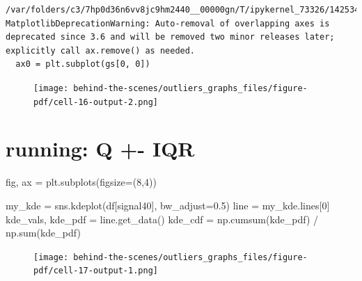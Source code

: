 \documentclass[
  letterpaper,
  DIV=11,
  numbers=noendperiod,
  oneside]{scrreprt}
\newenvironment{Shaded}{\begin{snugshade}}{\end{snugshade}}
\newcommand{\BuiltInTok}[1]{\textcolor[rgb]{0.00,0.23,0.31}{#1}}
\newcommand{\DecValTok}[1]{\textcolor[rgb]{0.68,0.00,0.00}{#1}}
\newcommand{\FloatTok}[1]{\textcolor[rgb]{0.68,0.00,0.00}{#1}}
\newcommand{\NormalTok}[1]{\textcolor[rgb]{0.00,0.23,0.31}{#1}}
\newcommand{\OperatorTok}[1]{\textcolor[rgb]{0.37,0.37,0.37}{#1}}
\newcommand{\StringTok}[1]{\textcolor[rgb]{0.13,0.47,0.30}{#1}}
\begin{document}
\begin{verbatim}
/var/folders/c3/7hp0d36n6vv8jc9hm2440__00000gn/T/ipykernel_73326/142534422.py:6: MatplotlibDeprecationWarning: Auto-removal of overlapping axes is deprecated since 3.6 and will be removed two minor releases later; explicitly call ax.remove() as needed.
  ax0 = plt.subplot(gs[0, 0])
\end{verbatim}

\begin{figure}[H]

{\centering \texttt{[image: behind-the-scenes/outliers\_graphs\_files/figure-pdf/cell-16-output-2.png]}

}

\end{figure}

\hypertarget{running-q---iqr}{%
\section{running: Q +- IQR}\label{running-q---iqr}}

\begin{Shaded}
\begin{Highlighting}[]
\NormalTok{fig, ax }\OperatorTok{=}\NormalTok{ plt.subplots(figsize}\OperatorTok{=}\NormalTok{(}\DecValTok{8}\NormalTok{,}\DecValTok{4}\NormalTok{))}

\NormalTok{my\_kde }\OperatorTok{=}\NormalTok{ sns.kdeplot(df[}\StringTok{\textquotesingle{}signal40\textquotesingle{}}\NormalTok{], bw\_adjust}\OperatorTok{=}\FloatTok{0.5}\NormalTok{)}
\NormalTok{line }\OperatorTok{=}\NormalTok{ my\_kde.lines[}\DecValTok{0}\NormalTok{]}
\NormalTok{kde\_vals, kde\_pdf }\OperatorTok{=}\NormalTok{ line.get\_data()}
\NormalTok{kde\_cdf }\OperatorTok{=}\NormalTok{ np.cumsum(kde\_pdf) }\OperatorTok{/}\NormalTok{ np.}\BuiltInTok{sum}\NormalTok{(kde\_pdf)}
\end{Highlighting}
\end{Shaded}

\begin{figure}[H]

{\centering \texttt{[image: behind-the-scenes/outliers\_graphs\_files/figure-pdf/cell-17-output-1.png]}

}

\end{figure}
\end{document}
